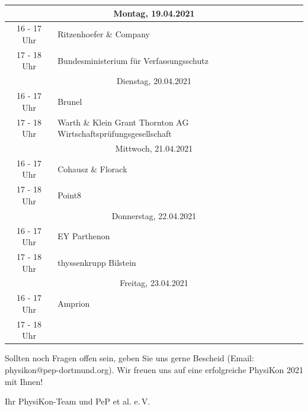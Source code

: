 \documentclass[
  paper=a4,
  fontsize=12pt,
  DIV=16,
  headheight=30pt,
  footheight=45pt,
  headinclude,
  parskip=half,
]{scrartcl}
\begin{document}
\begin{table}[h]
    \centering
\begin{tabular}{|c|l|}
    \hline
    \multicolumn{2}{|c|}{Montag, 19.04.2021} \\
    \hline
    \rowcolor{gray!10} 16 ­- 17 Uhr & Ritzenhoefer \& Company \\
    \rowcolor{gray!30} 17 - 18 Uhr & Bundesministerium für Verfassungsschutz\\
    \hline
    \multicolumn{2}{|c|}{Dienstag, 20.04.2021} \\
    \hline
    \rowcolor{gray!10} 16 ­- 17 Uhr & Brunel \\
    \rowcolor{gray!30} 17 - 18 Uhr & Warth \& Klein Grant Thornton AG Wirtschaftsprüfungsgesellschaft\\
    \hline
    \multicolumn{2}{|c|}{Mittwoch, 21.04.2021} \\
    \hline
    \rowcolor{gray!10} 16 ­- 17 Uhr & Cohausz \& Florack \\
    \rowcolor{gray!30} 17 - 18 Uhr & Point8\\
    \hline
    \multicolumn{2}{|c|}{Donnerstag, 22.04.2021} \\
    \hline
    \rowcolor{gray!10}16 ­- 17 Uhr & EY Parthenon\\
    \rowcolor{gray!30}17 - 18 Uhr & thyssenkrupp Bilstein\\
    \hline
    \multicolumn{2}{|c|}{Freitag, 23.04.2021} \\
    \hline
    \rowcolor{gray!10}16 ­- 17 Uhr & Amprion \\
    \rowcolor{gray!30}17 - 18 Uhr & \\
    \hline
    \end{tabular}

\end{table}



Sollten noch Fragen offen sein, geben Sie uns gerne Bescheid (Email: physikon@pep-dortmund.org).
Wir freuen uns auf eine erfolgreiche PhysiKon 2021 mit Ihnen!

\vspace{1cm}
Ihr PhysiKon-Team und PeP et al. e.\,V.
\end{document}
